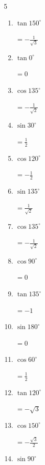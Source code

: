 \begin{multicols}{5}
\begin{enumerate}
  \item $\displaystyle \tan{150^\circ}$

        $\displaystyle =-\frac{1}{\sqrt{3}}$

  \item $\displaystyle \tan{0^\circ}$

        $\displaystyle =0$

  \item $\displaystyle \cos{135^\circ}$

        $\displaystyle =-\frac{1}{\sqrt{2}}$

  \item $\displaystyle \sin{30^\circ}$

        $\displaystyle =\frac{1}{2}$

  \item $\displaystyle \cos{120^\circ}$

        $\displaystyle =-\frac{1}{2}$

  \item $\displaystyle \sin{135^\circ}$

        $\displaystyle =\frac{1}{\sqrt{2}}$

  \item $\displaystyle \cos{135^\circ}$

        $\displaystyle =-\frac{1}{\sqrt{2}}$

  \item $\displaystyle \cos{90^\circ}$

        $\displaystyle =0$

  \item $\displaystyle \tan{135^\circ}$

        $\displaystyle =-1$

  \item $\displaystyle \sin{180^\circ}$

        $\displaystyle =0$

  \item $\displaystyle \cos{60^\circ}$

        $\displaystyle =\frac{1}{2}$

  \item $\displaystyle \tan{120^\circ}$

        $\displaystyle =-\sqrt{3}$

  \item $\displaystyle \cos{150^\circ}$

        $\displaystyle =-\frac{\sqrt{3}}{2}$

  \item $\displaystyle \sin{90^\circ}$


\end{enumerate}
\end{multicols}
